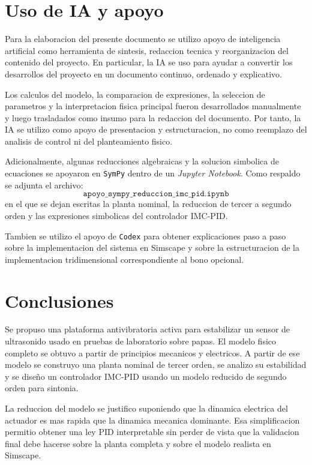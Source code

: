 \documentclass[11pt]{article}
\begin{document}
\section{Uso de IA y apoyo}

Para la elaboracion del presente documento se utilizo apoyo de inteligencia artificial como herramienta de sintesis, redaccion tecnica y reorganizacion del contenido del proyecto. En particular, la IA se uso para ayudar a convertir los desarrollos del proyecto en un documento continuo, ordenado y explicativo.

Los calculos del modelo, la comparacion de expresiones, la seleccion de parametros y la interpretacion fisica principal fueron desarrollados manualmente y luego trasladados como insumo para la redaccion del documento. Por tanto, la IA se utilizo como apoyo de presentacion y estructuracion, no como reemplazo del analisis de control ni del planteamiento fisico.

Adicionalmente, algunas reducciones algebraicas y la solucion simbolica de ecuaciones se apoyaron en \texttt{SymPy} dentro de un \textit{Jupyter Notebook}. Como respaldo se adjunta el archivo:
\[
\texttt{apoyo\_sympy\_reduccion\_imc\_pid.ipynb}
\]
en el que se dejan escritas la planta nominal, la reduccion de tercer a segundo orden y las expresiones simbolicas del controlador IMC-PID.

Tambien se utilizo el apoyo de \texttt{Codex} para obtener explicaciones paso a paso sobre la implementacion del sistema en Simscape y sobre la estructuracion de la implementacion tridimensional correspondiente al bono opcional.

\section{Conclusiones}

Se propuso una plataforma antivibratoria activa para estabilizar un sensor de ultrasonido usado en pruebas de laboratorio sobre papas. El modelo fisico completo se obtuvo a partir de principios mecanicos y electricos. A partir de ese modelo se construyo una planta nominal de tercer orden, se analizo su estabilidad y se dise\~no un controlador IMC-PID usando un modelo reducido de segundo orden para sintonia.

La reduccion del modelo se justifico suponiendo que la dinamica electrica del actuador es mas rapida que la dinamica mecanica dominante. Esa simplificacion permitio obtener una ley PID interpretable sin perder de vista que la validacion final debe hacerse sobre la planta completa y sobre el modelo realista en Simscape.
\end{document}
